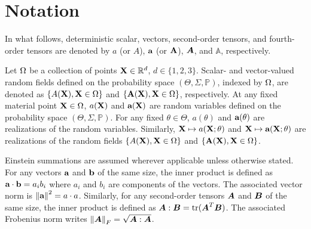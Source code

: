 \section{Notation}
\label{section: intro/notation}

In what follows, deterministic scalar, vectors, second-order tensors, and fourth-order tensors are denoted by $a$ (or $A$), $\textbf{a}$ (or $\textbf{A}$), $\boldsymbol{A}$, and $\mathbb{A}$, respectively.

Let $\Omega$ be a collection of points $\textbf{X} \in \mathbb{R}^d$, $d \in \{1, 2, 3\}$. Scalar- and vector-valued random fields defined on the probability space $(\Theta, \Sigma, \mathbb{P})$, indexed by $\Omega$, are denoted as $\{ A(\textbf{X}), \textbf{X} \in \Omega \}$ and $\{ \textbf{A}(\textbf{X}), \textbf{X} \in \Omega \}$, respectively.
At any fixed material point $\textbf{X} \in \Omega$, $a(\textbf{X})$ and $\textbf{a}(\textbf{X})$ are random variables defined on the probability space $(\Theta, \Sigma, \mathbb{P})$. For any fixed $\theta \in \Theta$, $a(\theta)$ and $\textbf{a}(\theta)$ are realizations of the random variables.
Similarly, $\textbf{X} \mapsto a(\textbf{X};\theta)$ and $\textbf{X} \mapsto \textbf{a}(\textbf{X};\theta)$ are realizations of the random fields $\{ A(\textbf{X}), \textbf{X} \in \Omega \}$ and $\{ \textbf{A}(\textbf{X}), \textbf{X} \in \Omega \}$.

Einstein summations are assumed wherever applicable unless otherwise stated. For any vectors $\textbf{a}$ and $\textbf{b}$ of the same size, the inner product is defined as $\textbf{a} \cdot \textbf{b} = a_ib_i$ where $a_i$ and $b_i$ are components of the vectors. The associated vector norm is $\left\lVert\textbf{a}\right\rVert^2 = a \cdot a$. Similarly, for any second-order tensors $\boldsymbol{A}$ and $\boldsymbol{B}$ of the same size, the inner product is defined as $\boldsymbol{A} : \boldsymbol{B} = \operatorname{tr}(\boldsymbol{A}^T \boldsymbol{B})$. The associated Frobenius norm writes $\left\lVert\boldsymbol{A}\right\rVert_F = \sqrt{\boldsymbol{A} : \boldsymbol{A}}$.

